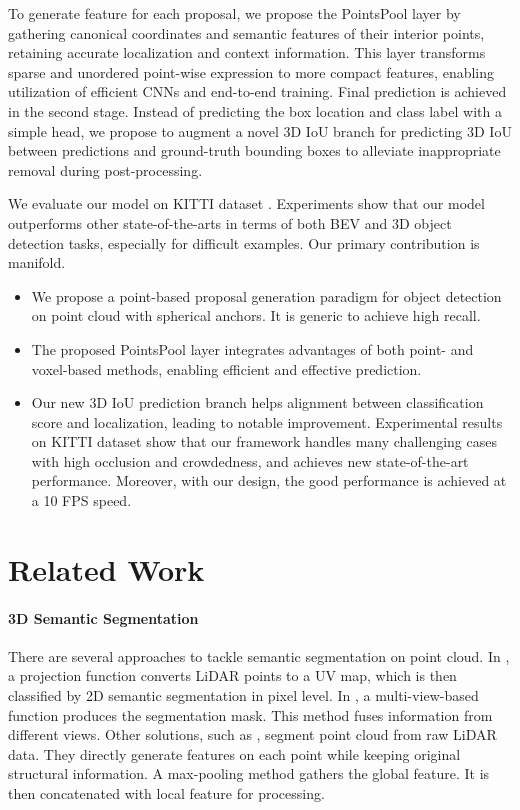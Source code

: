 \documentclass[10pt,twocolumn,letterpaper]{article}
\begin{document}
To generate feature for each proposal, we propose the PointsPool layer by gathering canonical coordinates and semantic features of their interior points, retaining accurate localization and context information. This layer transforms sparse and unordered point-wise expression to more compact features, enabling utilization of efficient CNNs and end-to-end training. Final prediction is achieved in the second stage. Instead of predicting the box location and class label with a simple head, we propose to augment a novel 3D IoU branch for predicting 3D IoU between predictions and ground-truth bounding boxes to alleviate inappropriate removal during post-processing.

We evaluate our model on KITTI dataset \cite{KITTI3DBENCHMARK}. Experiments show that our model outperforms other state-of-the-arts in terms of both BEV and 3D object detection tasks, especially for difficult examples. Our primary contribution is manifold.

\begin{itemize}\vspace{-0.05in}
\item We propose a point-based proposal generation paradigm for object detection on point cloud with spherical anchors. It is generic to achieve high recall. \vspace{-0.05in}

\item The proposed PointsPool layer integrates advantages of both point- and voxel-based methods, enabling efficient and effective prediction.
\vspace{-0.05in}

\item Our new 3D IoU prediction branch helps alignment between classification score and localization, leading to notable improvement. Experimental results on KITTI dataset show that our framework handles many challenging cases with high occlusion and crowdedness, and achieves new state-of-the-art performance. Moreover, with our design, the good performance is achieved at a 10 FPS speed.
\end{itemize}


\section{Related Work}

\paragraph{3D Semantic Segmentation} There are several approaches to tackle semantic segmentation on point cloud. In \cite{SQUEEZESEG}, a projection function converts LiDAR points to a UV map, which is then classified by 2D semantic segmentation \cite{SQUEEZESEG,PSPNET,DEEPLAB} in pixel level. In \cite{3DMV,SCANNET}, a multi-view-based function produces the segmentation mask. This method fuses information from different views. Other solutions, such as \cite{POINTNET2,POINTNET,POINTCNN,POINTSIFT,SONET}, segment point cloud from raw LiDAR data. They directly generate features on each point while keeping original structural information. A max-pooling method gathers the global feature. It is then concatenated with local feature for processing.
\end{document}
